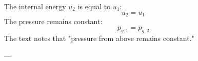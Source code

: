 The internal energy \( u_2 \) is equal to \( u_1 \):  
\[
u_2 = u_1
\]  
The pressure remains constant:  
\[
p_{g,1} = p_{g,2}
\]  
The text notes that "pressure from above remains constant."  

---